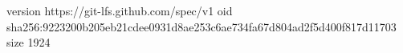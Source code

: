 version https://git-lfs.github.com/spec/v1
oid sha256:9223200b205eb21cdee0931d8ae253c6ae734fa67d804ad2f5d400f817d11703
size 1924
